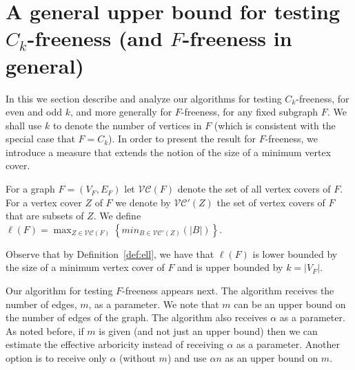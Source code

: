 \section{A general upper bound for testing $C_k$-freeness (and $F$-freeness in general)}\label{sec:Ck}


\newcommand{\VC}{\mathcal{VC}}

In this we section describe and analyze our algorithms for testing
$C_k$-freeness, for even and odd $k$, and more generally for $F$-freeness, for any fixed subgraph $F$. 
We shall use $k$ to denote the number of vertices in $F$ (which is consistent with the special case that $F=C_k$).
In order to present the result for $F$-freeness, we introduce a measure that extends the notion of the size of a minimum vertex cover.

\begin{definition}\label{def:ell}
    For a graph $F = (V_F, E_F)$ let $\VC(F)$ denote the set of all vertex covers of $F$. For a vertex cover $Z$ of $F$ we denote by $\VC'(Z)$ the set of vertex covers of $F$ that are subsets of $Z$.
    We define $\ell(F) = \max_{Z \in \VC(F)} \left\{min_{B \in \VC'(Z)} \left(|B|\right)\right\}$.
\end{definition}
Observe that by Definition~\ref{def:ell}, we have that $\ell(F)$ is lower bounded by the size of a minimum vertex cover of $F$ and is upper bounded by $k = |V_F|$.

Our algorithm for testing $F$-freeness appears next. The algorithm receives the number of edges, $m$, as a parameter. We note that $m$ can be an upper bound on the number of edges of the graph. The algorithm also receives $\alpha$ as a parameter. As noted before, if $m$ is given (and not just an upper bound) then we can estimate the effective arboricity instead of receiving $\alpha$ as a parameter. Another option is to receive only $\alpha$ (without $m$) and use $\alpha n$ as an upper bound on $m$.   

